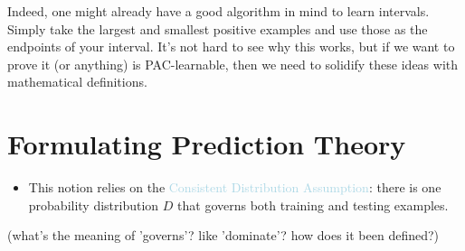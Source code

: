 \documentclass[12pt, a4paper, oneside]{article}
\begin{document}
Indeed, one might already have a good algorithm in mind to learn intervals. Simply take the largest and smallest positive examples and use those as the endpoints of your interval. 
It’s not hard to see why this works, but if we want to prove it (or anything) is PAC-learnable, then we need to solidify these ideas with mathematical definitions.


\section{Formulating Prediction Theory}
\begin{itemize}
    \item This notion relies on the \textcolor{lightBlue}{Consistent Distribution Assumption}: there is one probability distribution $D$ that governs both training and testing examples.
\end{itemize}
(what's the meaning of 'governs'? like 'dominate'? how does it been defined?)
\end{document}
